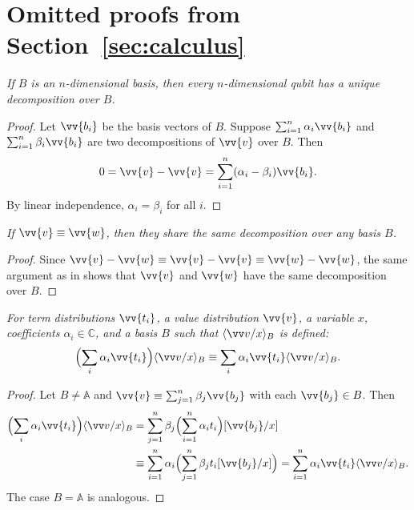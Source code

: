 \documentclass[runningheads,orivec,envcountsame,envcountsect]{llncs}
\newcommand\ansubst[2]{\ensuremath{\langle #1 \rangle_{#2}}}
\newcommand\AbsBasis{\ensuremath{\mathbb{A}}}
\def\C{\mathbb{C}}            %
\begin{document}
\clearpage

\makeatletter
\renewcommand*\theHsection{\thesection}
\makeatother
\appendix

\section{Omitted proofs from Section~\ref{sec:calculus}}\label{sec:appendixA}

\begin{restatetheorem}
  \itshape
  If $B$ is an $n$-dimensional basis, then every $n$-dimensional qubit has
  a unique decomposition over $B$.
\end{restatetheorem}
\begin{proof}
  Let $\vv{b_i}$ be the basis vectors of $B$. Suppose
  $\sum_{i=1}^n \alpha_i \vv{b_i}$ and $\sum_{i=1}^n \beta_i \vv{b_i}$
  are two decompositions of $\vv{v}$ over $B$. Then
  \[
    0=\vv{v}-\vv{v}=\sum_{i=1}^{n}(\alpha_i-\beta_i)\vv{b_i}.
  \]
  By linear independence, $\alpha_i=\beta_i$ for all $i$.
\end{proof}

\begin{restatecorollary}
  \itshape
  If $\vv{v}\equiv\vv{w}$, then they share the same decomposition over any
  basis $B$.
\end{restatecorollary}
\begin{proof}
  Since $\vv{v}-\vv{w}\equiv\vv{v}-\vv{v}\equiv\vv{w}-\vv{w}$, the same
  argument as in  shows that $\vv{v}$ and $\vv{w}$ have the
  same decomposition over $B$.
\end{proof}

\begin{restatelemma}
  \itshape
  For term distributions $\vv{t_i}$, a value distribution $\vv{v}$, a
  variable $x$, coefficients $\alpha_i\in\C$, and a basis $B$ such that
  $\ansubst{\vv v/x}{B}$ is defined:
  \[
    \Bigl(\sum_i \alpha_i\vv{t_i}\Bigr)\ansubst{\vv v/x}{B}
    \equiv
    \sum_i \alpha_i\vv{t_i} \ansubst{\vv v/x}{B}.
  \]
\end{restatelemma}
\begin{proof}
  Let $B\neq\AbsBasis$ and
  $\vv{v}\equiv\sum_{j=1}^n\beta_j\vv{b_j}$ with each $\vv{b_j}\in B$.
  Then
  \begin{align*}
    \Bigl(\sum_i \alpha_i\vv{t_i}\Bigr)\ansubst{\vv v/x}{B}
    &= \sum_{j=1}^n \beta_j\Bigl(\sum_{i=1}^{n}\alpha_i t_i\Bigr)[\vv{b_j}/x]\\
    &\equiv \sum_{i=1}^{n}\alpha_i\Bigl(\sum_{j=1}^n\beta_j t_i[\vv{b_j}/x]\Bigr)
    = \sum_{i=1}^{n}\alpha_i\vv{t_i}\ansubst{\vv v/x}{B}.
  \end{align*}
  The case $B=\AbsBasis$ is analogous.
\end{proof}
\end{document}
